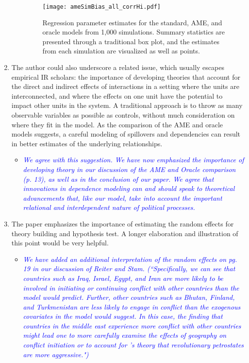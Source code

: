 \begin{enumerate}
\begin{itemize}
{{		\begin{figure}[ht]
		\caption{Regression parameter estimates for the standard, AME, and oracle models from 1,000 simulations. Summary statistics are presented through a traditional box plot, and the estimates from each simulation are visualized as well as points.}
		\label{fig:ameBias}
		\texttt{[image: ameSimBias\_all\_corrHi.pdf]} \\
		\end{figure}		
		}}
	\end{itemize}
	\item The author could also underscore a related issue, which usually escapes empirical IR scholars: the importance of developing theories that account for the direct and indirect effects of interactions in a setting where the units are interconnected, and where the effects on one unit have the potential to impact other units in the system. A traditional approach is to throw as many observable variables as possible as controls, without much consideration on where they fit in the model. As the comparison of the AME and oracle models suggests, a careful modeling of spillovers and dependencies can result in better estimates of the underlying relationships.
	\begin{itemize}
		\item \textcolor{blue}{ \emph{
		We agree with this suggestion. We have now emphasized the importance of developing theory in our discussion of the AME and Oracle comparison (p. 13), as well as in the conclusion of our paper. We agree that innovations in dependence modeling can and should speak to theoretical advancements that, like our model, take into account the important relational and interdependent nature of political processes.
		}}
	\end{itemize}
	\item The paper emphasizes the importance of estimating the random effects for theory building and hypothesis test. A longer elaboration and illustration of this point would be very helpful.
	\begin{itemize}
		\item \textcolor{blue}{ \emph{
		We have added an additional interpretation of the random effects on pg. 19 in our discussion of Reiter and Stam. (``Specifically, we can see that countries such as Iraq, Israel, Egypt, and Iran are more likely to be involved in initiating or continuing conflict with other countries than the model would predict. Further, other countries such as Bhutan, Finland, and Turkmenistan are less likely to engage in conflict than the exogenous covariates in the model would suggest. In this case, the finding that countries in the middle east experience more conflict with other countries might lead one to more carefully examine the effects of geography on conflict initiation or to account for \citet{colgan:2010}'s theory that revolutionary petrostates are more aggressive.")
}}
\end{itemize}
\end{enumerate}
